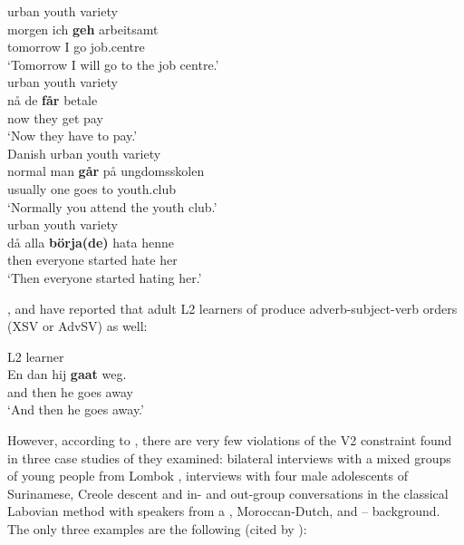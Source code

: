\documentclass[output=paper]{langsci/langscibook}
\begin{document}
\ea
    \ea {} urban youth variety \parencite[787]{Wiese:2009}\\
    \gll morgen ich \textbf{geh} arbeitsamt\\
    tomorrow I go job.centre\\
    \trans \enquote*{Tomorrow I will go to the job centre.}\\
    \ex {} urban youth variety \parencite[133]{Opsahl:2009a}\\
    \gll n\aa{} de \textbf{f{\aa}r} betale\\
    now they get pay\\
    \trans \enquote*{Now they have to pay.}\\
    \ex Danish urban youth variety \parencite[47]{Quist:2008}\\
    \gll normal man \textbf{g{\aa}r} p{\aa} ungdomsskolen\\
    usually one goes to youth.club\\
    \trans \enquote*{Normally you attend the youth club.}\\
    \ex {} urban youth variety \parencite[53]{Ganuza:2008}\\
    \gll d\aa{} alla \textbf{b\"orja(de)} hata henne\\
    then everyone started hate her\\
    \trans \enquote*{Then everyone started hating her.}
    \z
\z

\largerpage
\noindent \citet{Appel:1984}, \citet[91]{AppelMuysken:1987} and
\citet{SchwartzSprouse:2000} have reported that adult L2 learners of 
produce adverb-subject-verb orders (XSV or AdvSV) as well:

\begin{exe}                   %
\ex {} L2 learner \parencite{Appel:1984}\\
    \gll En dan hij \textbf{gaat} weg.\\
    and then he goes away\\
    \trans \enquote*{And then he goes away.}
\end{exe}                   %

\noindent However, according to \citet{Freywaldetal:2015}, there are very few
violations of the V2 constraint found in three case studies of  they
examined: bilateral interviews with a mixed groups of young people from Lombok
\citep{Cornips:2002}, interviews with four male adolescents of Surinamese,
Creole descent \citep{CornipsDeRooij:2013} and in- and out-group conversations
in the classical Labovian method with speakers from a , Moroccan-Dutch,
and -- background. The only three examples are the following (cited
by \citealt[86--87]{Freywaldetal:2015}):\largerpage
\end{document}

